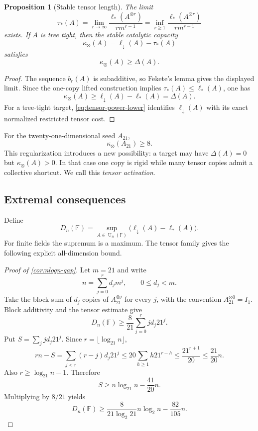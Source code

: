 \documentclass[11pt]{amsart}
\numberwithin{equation}{section}
\newtheorem{proposition}[theorem]{Proposition}
\theoremstyle{definition}
\theoremstyle{remark}
\newcommand{\F}{\mathbb F}
\newcommand{\U}{\operatorname{U}}
\newcommand{\ellDown}{\ell_{\downarrow}}
\newcommand{\ellAll}{\ell_{*}}
\newcommand{\DeltaDef}{\Delta}
\begin{document}
\begin{proposition}[Stable tensor length]\label{prop:stable-tensor-length}
The limit
\[
\tau_*(A)
=
\lim_{r\to\infty}
\frac{\ellAll(A^{\otimes r})}{r m^{r-1}}
=
\inf_{r\ge1}
\frac{\ellAll(A^{\otimes r})}{r m^{r-1}}
\]
exists.  If $A$ is tree tight, then the stable catalytic capacity
\[
\kappa_\otimes(A)
=
\ellDown(A)-\tau_*(A)
\]
satisfies
\[
\kappa_\otimes(A)\ge\DeltaDef(A).
\]
\end{proposition}

\begin{proof}
The sequence $b_r(A)$ is subadditive, so Fekete's lemma gives the displayed limit.  Since the one-copy lifted construction implies $\tau_*(A)\le\ellAll(A)$, one has
\[
\kappa_\otimes(A)
\ge
\ellDown(A)-\ellAll(A)
=
\DeltaDef(A).
\]
For a tree-tight target, \cref{eq:tensor-power-lower} identifies $\ellDown(A)$ with its exact normalized restricted tensor cost.
\end{proof}

For the twenty-one-dimensional seed $A_{21}$,
\[
\kappa_\otimes(A_{21})\ge8.
\]
This regularization introduces a new possibility: a target may have $\DeltaDef(A)=0$ but $\kappa_\otimes(A)>0$.  In that case one copy is rigid while many tensor copies admit a collective shortcut.  We call this \emph{tensor activation}.

\subsection{Extremal consequences}

Define
\[
D_n(\F)
=
\sup_{A\in\U_n(\F)}
\bigl(\ellDown(A)-\ellAll(A)\bigr).
\]
For finite fields the supremum is a maximum.  The tensor family gives the following explicit all-dimension bound.

\begin{proof}[Proof of \cref{cor:nlogn-gap}]
Let $m=21$ and write
\[
n=\sum_{j=0}^{r}d_jm^j,
\qquad
0\le d_j<m.
\]
Take the block sum of $d_j$ copies of $A_{21}^{\otimes j}$ for every $j$, with the convention $A_{21}^{\otimes0}=I_1$.  Block additivity and the tensor estimate give
\[
D_n(\F)
\ge
\frac{8}{21}
\sum_{j=0}^{r}j d_j21^j.
\]
Put $S=\sum_j j d_j21^j$.  Since $r=\lfloor\log_{21}n\rfloor$,
\[
r n-S
=
\sum_{j<r}(r-j)d_j21^j
\le
20\sum_{h\ge1}h21^{r-h}
\le
\frac{21^{r+1}}{20}
\le
\frac{21}{20}n.
\]
Also $r\ge\log_{21}n-1$.  Therefore
\[
S\ge n\log_{21}n-\frac{41}{20}n.
\]
Multiplying by $8/21$ yields
\[
D_n(\F)
\ge
\frac{8}{21\log_2 21}n\log_2n
-
\frac{82}{105}n.
\]
\end{proof}
\end{document}
